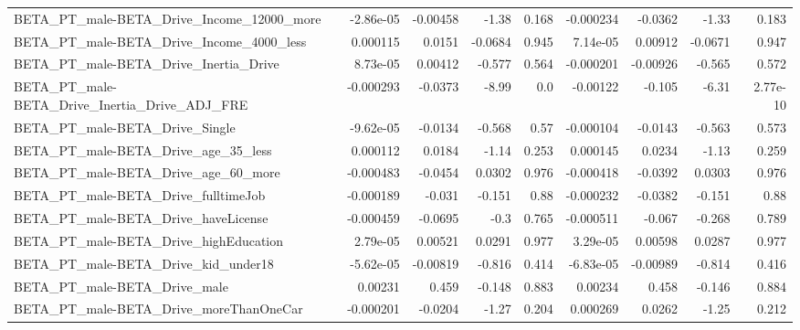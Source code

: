 \begin{tabular}{lrrrrrrrr}
BETA\_PT\_male-BETA\_Drive\_Income\_12000\_more          &   -2.86e-05 &     -0.00458 &    -1.38 &    0.168 &  -0.000234 &     -0.0362 &        -1.33 &         0.183 \\
BETA\_PT\_male-BETA\_Drive\_Income\_4000\_less           &    0.000115 &       0.0151 &  -0.0684 &    0.945 &   7.14e-05 &     0.00912 &      -0.0671 &         0.947 \\
BETA\_PT\_male-BETA\_Drive\_Inertia\_Drive              &    8.73e-05 &      0.00412 &   -0.577 &    0.564 &  -0.000201 &    -0.00926 &       -0.565 &         0.572 \\
BETA\_PT\_male-BETA\_Drive\_Inertia\_Drive\_ADJ\_FRE      &   -0.000293 &      -0.0373 &    -8.99 &      0.0 &   -0.00122 &      -0.105 &        -6.31 &      2.77e-10 \\
BETA\_PT\_male-BETA\_Drive\_Single                     &   -9.62e-05 &      -0.0134 &   -0.568 &     0.57 &  -0.000104 &     -0.0143 &       -0.563 &         0.573 \\
BETA\_PT\_male-BETA\_Drive\_age\_35\_less                &    0.000112 &       0.0184 &    -1.14 &    0.253 &   0.000145 &      0.0234 &        -1.13 &         0.259 \\
BETA\_PT\_male-BETA\_Drive\_age\_60\_more                &   -0.000483 &      -0.0454 &   0.0302 &    0.976 &  -0.000418 &     -0.0392 &       0.0303 &         0.976 \\
BETA\_PT\_male-BETA\_Drive\_fulltimeJob                &   -0.000189 &       -0.031 &   -0.151 &     0.88 &  -0.000232 &     -0.0382 &       -0.151 &          0.88 \\
BETA\_PT\_male-BETA\_Drive\_haveLicense                &   -0.000459 &      -0.0695 &     -0.3 &    0.765 &  -0.000511 &      -0.067 &       -0.268 &         0.789 \\
BETA\_PT\_male-BETA\_Drive\_highEducation              &    2.79e-05 &      0.00521 &   0.0291 &    0.977 &   3.29e-05 &     0.00598 &       0.0287 &         0.977 \\
BETA\_PT\_male-BETA\_Drive\_kid\_under18                &   -5.62e-05 &     -0.00819 &   -0.816 &    0.414 &  -6.83e-05 &    -0.00989 &       -0.814 &         0.416 \\
BETA\_PT\_male-BETA\_Drive\_male                       &     0.00231 &        0.459 &   -0.148 &    0.883 &    0.00234 &       0.458 &       -0.146 &         0.884 \\
BETA\_PT\_male-BETA\_Drive\_moreThanOneCar             &   -0.000201 &      -0.0204 &    -1.27 &    0.204 &   0.000269 &      0.0262 &        -1.25 &         0.212 \\

\end{tabular}
